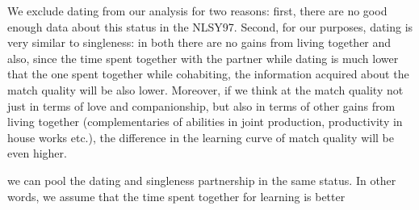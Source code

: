 \documentclass[12pt]{article}
\begin{document}
  We exclude dating from our analysis for two reasons: first, there are no good enough data about this status in the NLSY97. Second, for our purposes, dating is very similar to singleness: in both there are no gains from living together and also, since the time spent together with the partner while dating is much lower that the one spent together while cohabiting, the information acquired about the match quality will be also lower. Moreover, if we think at the match quality not just in terms of love and companionship, but also in terms of other gains from living together (complementaries of abilities in joint production, productivity in house works etc.), the difference in the learning curve of match quality will be even higher.
 
  we can pool the dating and singleness partnership in the same status. In other words, we assume that the time spent together for learning is better
 
\end{document}
